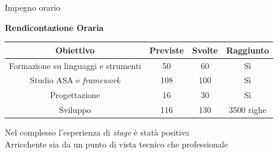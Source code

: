 \documentclass{beamer}
\begin{document}
\begin{frame}{Impegno orario}
\centering
\small
\begin{table}[h]
\centering
\textbf{Rendicontazione Oraria} \\
\vspace{.5em}
\begin{tabular}{c c c c}
\toprule
\textbf{Obiettivo} & \textbf{Previste} & \textbf{Svolte} & \textbf{Raggiunto} \\
\midrule
Formazione su linguaggi e strumenti &  50 & 60 & Sì\\
\hline
Studio ASA e \textit{framework} & 108 & 100 & Sì \\
\hline
Progettazione & 16 & 30 & Sì\\
\hline
Sviluppo & 116 &130 & 3500 righe\\
\bottomrule
\end{tabular}
\end{table}
  \vspace{0.5cm}
  \centering
  Nel complesso l'esperienza di \textit{stage} è statà positiva\\ \vspace{.5em}
  Arricchente sia da un punto di vista tecnico che professionale
\end{frame}

\end{document}
